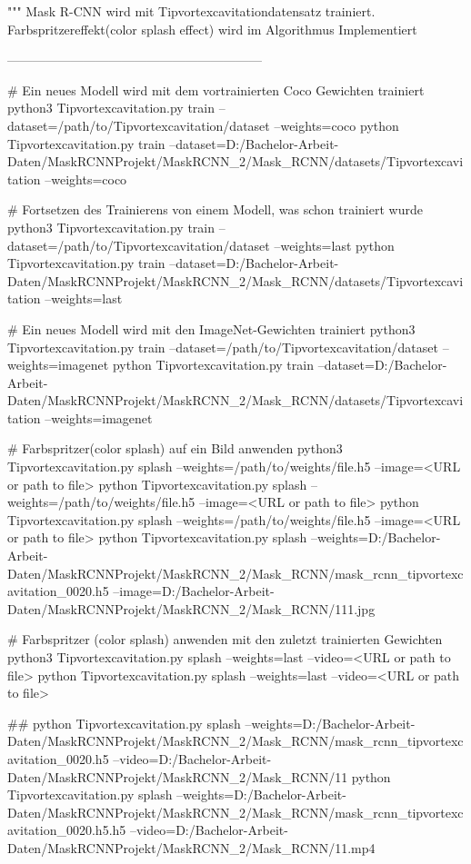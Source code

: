 """
Mask R-CNN wird mit Tipvortexcavitationdatensatz trainiert. Farbspritzereffekt(color splash effect) wird im Algorithmus Implementiert

------------------------------------------------------------



    # Ein neues Modell wird mit dem vortrainierten Coco Gewichten trainiert
    python3 Tipvortexcavitation.py train --dataset=/path/to/Tipvortexcavitation/dataset --weights=coco
    python  Tipvortexcavitation.py train --dataset=D:/Bachelor-Arbeit-Daten/MaskRCNNProjekt/MaskRCNN_2/Mask_RCNN/datasets/Tipvortexcavitation --weights=coco

    # Fortsetzen des Trainierens von einem Modell, was schon trainiert wurde 
    python3 Tipvortexcavitation.py train --dataset=/path/to/Tipvortexcavitation/dataset --weights=last
    python  Tipvortexcavitation.py train --dataset=D:/Bachelor-Arbeit-Daten/MaskRCNNProjekt/MaskRCNN_2/Mask_RCNN/datasets/Tipvortexcavitation --weights=last

    # Ein neues Modell wird mit den ImageNet-Gewichten trainiert
    python3 Tipvortexcavitation.py train --dataset=/path/to/Tipvortexcavitation/dataset --weights=imagenet
    python  Tipvortexcavitation.py train --dataset=D:/Bachelor-Arbeit-Daten/MaskRCNNProjekt/MaskRCNN_2/Mask_RCNN/datasets/Tipvortexcavitation --weights=imagenet
    

    # Farbspritzer(color splash) auf ein Bild anwenden
    python3 Tipvortexcavitation.py splash --weights=/path/to/weights/file.h5 --image=<URL or path to file>
    python  Tipvortexcavitation.py splash --weights=/path/to/weights/file.h5 --image=<URL or path to file>
    python  Tipvortexcavitation.py splash --weights=/path/to/weights/file.h5 --image=<URL or path to file>
    python Tipvortexcavitation.py  splash --weights=D:/Bachelor-Arbeit-Daten/MaskRCNNProjekt/MaskRCNN_2/Mask_RCNN/mask_rcnn_tipvortexcavitation_0020.h5 --image=D:/Bachelor-Arbeit-Daten/MaskRCNNProjekt/MaskRCNN_2/Mask_RCNN/111.jpg

    

    

    # Farbspritzer (color splash) anwenden mit den zuletzt trainierten Gewichten
    python3 Tipvortexcavitation.py splash --weights=last --video=<URL or path to file>
    python  Tipvortexcavitation.py splash --weights=last --video=<URL or path to file>  
    
    ##
        python Tipvortexcavitation.py splash --weights=D:/Bachelor-Arbeit-Daten/MaskRCNNProjekt/MaskRCNN_2/Mask_RCNN/mask_rcnn_tipvortexcavitation_0020.h5 --video=D:/Bachelor-Arbeit-Daten/MaskRCNNProjekt/MaskRCNN_2/Mask_RCNN/11
        python Tipvortexcavitation.py splash --weights=D:/Bachelor-Arbeit-Daten/MaskRCNNProjekt/MaskRCNN_2/Mask_RCNN/mask_rcnn_tipvortexcavitation_0020.h5.h5 --video=D:/Bachelor-Arbeit-Daten/MaskRCNNProjekt/MaskRCNN_2/Mask_RCNN/11.mp4



